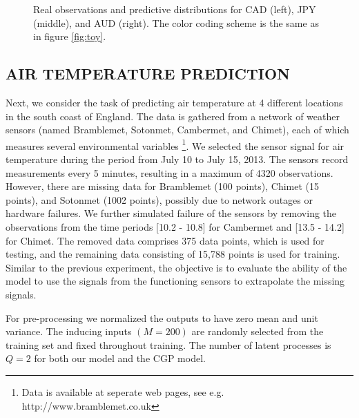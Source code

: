 \begin{figure}
\begin{tabular}{ccc}
\end{tabular}
\caption{Real observations and predictive distributions for CAD (left), JPY (middle), and AUD (right). The color coding scheme is the same as in figure \ref{fig:toy}.}
\label{fig:fx}
\end{figure}

\subsection{AIR TEMPERATURE PREDICTION}
Next, we consider the task of predicting air temperature at 4 different locations in the south coast of England. 
The data is gathered from a network of weather sensors (named Bramblemet, Sotonmet, Cambermet, and Chimet), each of which measures several environmental variables \citet{osborne2008towards}\footnote{Data is available at seperate web pages, see e.g. http://www.bramblemet.co.uk}.
We selected the sensor signal for air temperature during the period from July 10 to July 15, 2013.
The sensors record measurements every 5 minutes, resulting in a maximum of 4320 observations.
However, there are missing data for Bramblemet (100 points), Chimet (15 points), and Sotonmet (1002 points), possibly due to network outages or hardware failures.
We further simulated failure of the sensors by removing the observations from the time periods [10.2 - 10.8] for Cambermet and [13.5 - 14.2] for Chimet.
The removed data comprises 375 data points, which is used for testing, and the remaining data consisting of 15,788 points is used for training.
Similar to the previous experiment, the objective is to evaluate the ability of the model to use the signals from the functioning sensors to extrapolate the missing signals.

For pre-processing we normalized the outputs to have zero mean and unit variance.
The inducing inputs $(M = 200)$ are randomly selected from the training set and fixed throughout training.
The number of latent processes is $Q = 2$ for both our model and the CGP model.

